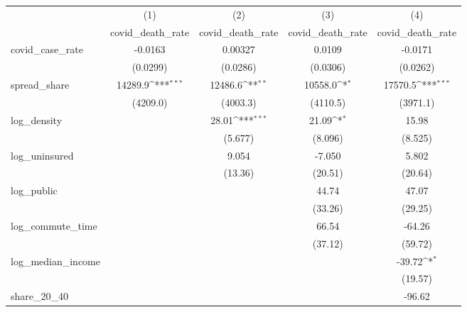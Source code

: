{
\def\sym#1{\ifmmode^{#1}\else\(^{#1}\)\fi}
\begin{tabular}{l*{4}{c}}
\hline\hline
            &\multicolumn{1}{c}{(1)}&\multicolumn{1}{c}{(2)}&\multicolumn{1}{c}{(3)}&\multicolumn{1}{c}{(4)}\\
            &\multicolumn{1}{c}{covid\_death\_rate}&\multicolumn{1}{c}{covid\_death\_rate}&\multicolumn{1}{c}{covid\_death\_rate}&\multicolumn{1}{c}{covid\_death\_rate}\\
\hline
covid\_case\_rate&     -0.0163         &     0.00327         &      0.0109         &     -0.0171         \\
            &    (0.0299)         &    (0.0286)         &    (0.0306)         &    (0.0262)         \\
[1em]
spread\_share&     14289.9\sym{***}&     12486.6\sym{**} &     10558.0\sym{*}  &     17570.5\sym{***}\\
            &    (4209.0)         &    (4003.3)         &    (4110.5)         &    (3971.1)         \\
[1em]
log\_density &                     &       28.01\sym{***}&       21.09\sym{*}  &       15.98         \\
            &                     &     (5.677)         &     (8.096)         &     (8.525)         \\
[1em]
log\_uninsured&                     &       9.054         &      -7.050         &       5.802         \\
            &                     &     (13.36)         &     (20.51)         &     (20.64)         \\
[1em]
log\_public  &                     &                     &       44.74         &       47.07         \\
            &                     &                     &     (33.26)         &     (29.25)         \\
[1em]
log\_commute\_time&                     &                     &       66.54         &      -64.26         \\
            &                     &                     &     (37.12)         &     (59.72)         \\
[1em]
log\_median\_income&                     &                     &                     &      -39.72\sym{*}  \\
            &                     &                     &                     &     (19.57)         \\
[1em]
share\_20\_40 &                     &                     &                     &      -96.62         \\

\end{tabular}}
